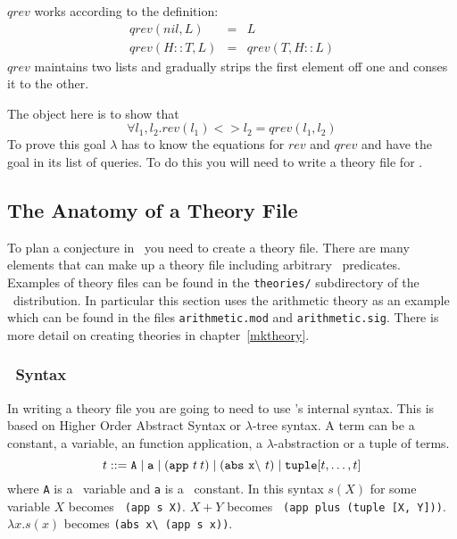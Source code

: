 $qrev$ works according to the definition:
\begin{eqnarray}
qrev(nil, L) & = & L \label{def:qrev1}\\
qrev(H::T, L) & = & qrev(T, H::L) \label{def:qrev2}
\end{eqnarray}
$qrev$ maintains two lists and gradually strips the first element off
one and conses it to the other.  

The object here is to show that 
$$\forall l_1, l_2. rev(l_1) <> l_2 =
qrev(l_1, l_2)$$ 
To prove this goal $\lambda${\clam} has to know the equations
for $rev$ and $qrev$ and have the goal in its list of
queries.  To do this you will need to write a theory file for \lclam.  

\subsection{The Anatomy of a Theory File}
To plan a conjecture in \lclam\ you need to create a theory file.
There are many elements that can make up a theory file including arbitrary \lprolog\ predicates.  Examples of theory
files can be found in the {\tt theories/} subdirectory of the \lclam\
distribution.  In particular this section uses the arithmetic
theory as an example which can be found in
the files {\tt arithmetic.mod} and {\tt arithmetic.sig}.  There is more detail on creating theories in chapter~\ref{mktheory}.

\subsubsection{\lclam\ Syntax}
\label{sec:tut:syntax}
In writing a theory file you are going to need to
use \lclam's internal syntax.  This is based on Higher Order Abstract
Syntax\index{HOAS} or $\lambda$-tree 
syntax.  
A term can be a constant, a variable, an function
application, a $\lambda$-abstraction or a tuple of terms.
\begin{equation}
t ::= {\tt A} \mid {\tt a} \mid {\tt (app \mbox{ }} t \: t {\tt )}
\mid {\tt (abs \mbox{ }
x\backslash \mbox{ }} t {\tt )} \mid {\tt tuple [} t, \ldots, t {\tt ]}
\end{equation}
where {\tt A} is a \lprolog\ variable and {\tt a} is a \lprolog\
constant.  In this syntax $s(X)$ for some variable $X$ becomes {\tt
(app s X)}\index{app}\index{abs}\index{tuple}.  $X + Y$ becomes {\tt
(app plus (tuple [X, Y]))}.  $\lambda x. s(x)$ becomes 
\verb+(abs x\ (app s x))+.

